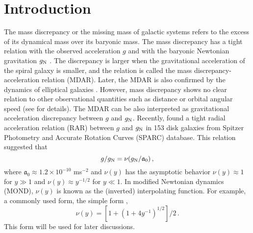 \documentclass[fleqn,usenatbib,useAMS]{mnras}
\begin{document}
    \section{Introduction}\label{sec:intro}
    The mass discrepancy or the missing mass of galactic systems refers to the excess of its dynamical mass over its baryonic mass.
    The mass discrepancy has a tight relation with the observed acceleration $g$ \citep{Sanders90,McGaugh99,McGaugh04} and with the baryonic Newtonian gravitation $g_{\rm N}$ \citep{McGaugh04,TC09,FM12}.
    The discrepancy is larger when the gravitational acceleration of the spiral galaxy is smaller, and the relation is called the mass discrepancy-acceleration relation (MDAR).
    Later, the MDAR is also confirmed by the dynamics of elliptical galaxies \citep{TC16,Janz16}.
    However, mass discrepancy shows no clear relation to other observational quantities such as distance or orbital angular speed (see \cite{McGaugh04} for details).
    The MDAR can be also interpreted as gravitational acceleration discrepancy between $g$ and $g_{\rm N}$.
    Recently, \cite{McGaugh16} found a tight radial acceleration relation (RAR) between $g$ and $g_{\rm N}$ in 153 disk galaxies from Spitzer Photometry and Accurate Rotation Curves (SPARC) database.
    This relation suggested that
    \begin{equation}\label{eq:MOND}
      g/g_{\rm N}=\nu(g_{\rm N}/\mathfrak{a}_0)\,,
    \end{equation}
    where $\mathfrak{a}_0\approx1.2\times10^{-10}$ ms$^{-2}$ and $\nu(y)$ has the asymptotic behavior $\nu(y)\approx 1$ for $y\gg 1$ and $\nu(y)\approx y^{-1/2}$ for $y\ll 1$.
    In modified Newtonian dynamics (MOND), $\nu(y)$ is known as the (inverted) interpolating function.
    For example, a commonly used form, the simple form \citep{FB05},
    \begin{equation}\label{eq:Simple}
      \nu(y)=[1+(1+4y^{-1})^{1/2}]/2\,.
    \end{equation}
    This form will be used for later discussions.
\end{document}
